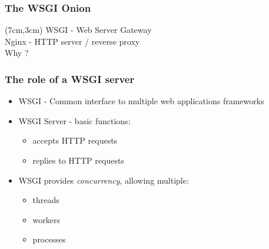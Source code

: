 \documentclass{beamer}
\begin{document}
\begin{frame}
\frametitle<presentation>{The WSGI Onion}


\begin{textblock*}{5cm}(7cm,3cm)
WSGI - Web Server Gateway \\
\vspace{0.4cm}
Nginx - HTTP server / reverse proxy \\
\vspace{0.4cm}
\huge{Why ?}
\end{textblock*}
\end{frame}

\begin{frame}
\frametitle<presentation>{The role of a WSGI server}

\begin{itemize}
  \item WSGI - Common interface to multiple web applications frameworks
  \item WSGI Server - basic functions:
  \begin{itemize}
    \item accepts HTTP requests
    \item replies to HTTP requests
  \end{itemize}
  \item WSGI provides \textit{concurrency}, allowing multiple: 
  \begin{itemize}
    \item threads
    \item workers
    \item processes
  \end{itemize} 
\end{itemize}
\end{frame}
\end{document}
